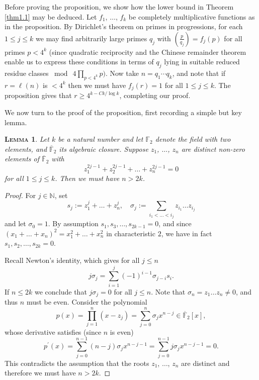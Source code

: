 \documentclass[11pt,makeidx, reqno]{amsart}
\theoremstyle{mystyle}
\newtheorem{lemma}[theorem]{\textsc{Lemma}}
\theoremstyle{definition}
\begin{document}
Before proving the proposition, we show how the lower bound in Theorem \ref{thm1.1} may be deduced. Let $f_1$, $\ldots$, $f_k$ be completely multiplicative functions as in the proposition.   By Dirichlet's theorem on primes in progressions, for each $1\le j\le k$ we may find arbitrarily large primes $q_j$ with $(\frac {p}{q_j}) = f_j(p)$ for all primes $p <4^k$ (since quadratic reciprocity and the Chinese remainder theorem enable us to express these conditions in terms of $q_j$ lying in suitable reduced residue classes $\bmod\ {4\prod_{p< 4^k} p})$.   Now take $n=q_1 \cdots q_k$, and note that if $r =\ell(n)$ is $<4^k$ then we must have $f_j(r)=1$ for all $1\le j\le k$.  The proposition gives that $r\ge 4^{k-Ck/\log k}$, completing our proof.  

We now turn to the proof of the proposition, first recording a simple but key lemma. 


\begin{lemma}\label{newtonsIdent} 
    Let $k$ be a natural number and let ${\mathbb F}_2$ denote the field with two elements, and $\overline{\mathbb F}_2$ its algebraic closure.  Suppose $z_1$, $\ldots$, $z_n$ are distinct non-zero elements of $\overline{{\mathbb F}}_2$ with 
    $$ 
    z_1^{2j-1} + z_2^{2j-1} + \ldots + z_n^{2j-1} =0
    $$
    for all $1\le j\le k$.   Then we must have $n> 2k$.  
\end{lemma}

\begin{proof}
    For $j \in \mathbb{N}$, set
    \[s_j := z_1^j + \dots + z_n^j, \quad \sigma_j := \sum_{i_1 < \dots < i_j} z_{i_1} \dots z_{i_j}\]
    and let $\sigma_0 = 1$. By assumption $s_1, s_3, \dots, s_{2k-1} = 0$, and since $(x_1 + \dots + x_n)^2 = x_1^2 + \dots + x_n^2$ in characteristic $2$, we have in fact $s_1, s_2, \dots, s_{2k} = 0$.

Recall Newton's identity, which gives for all $j\le n$
    \[
    j \sigma_j = \sum_{i=1}^j (-1)^{i-1}\sigma_{j-i}s_i. 
    \]
    If $n\le 2k$ we conclude that $j\sigma_j =0$ for all $j\le n$. Note that $\sigma_n = z_1\ldots z_n \neq 0$, and thus $n$ must be even.   Consider the polynomial 
    $$ 
    p(x) = \prod_{j=1}^{n} (x-z_j) = \sum_{j=0}^{n} \sigma_j x^{n-j} \in {\overline{\mathbb F}}_2[x],
    $$
    whose derivative satisfies (since $n$ is even)
$$
p^{\prime}(x) = \sum_{j=0}^{n-1} (n-j) \sigma_j x^{n-j-1} = 
\sum_{j=0}^{n-1} j\sigma_j x^{n-j-1} = 0.
$$
This contradicts the assumption that the roots $z_1$, $\ldots$, $z_n$ are distinct and therefore we must have $n>2k$. 
\end{proof}
\end{document}
